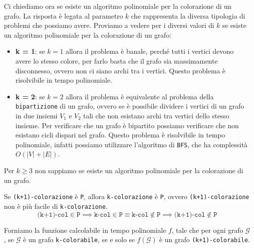 Ci chiediamo ora se esiste un algoritmo polinomiale per la colorazione di un grafo.
La risposta è legata al parametro $k$ che rappresenta la diversa tipologia di 
problemi che possiamo avere. Proviamo a vedere per i diversi valori di $k$ se esiste
un algoritmo polinomiale per la colorazione di un grafo:
\begin{itemize}
    \item \textbf{k = 1}: se $k = 1$ allora il problema è banale, perché tutti i vertici
    devono avere lo stesso colore, per farlo basta che il grafo sia massimamente disconnesso,
    ovvero non ci siano archi tra i vertici. Questo problema è risolvibile in tempo polinomiale.
    \item \textbf{k = 2}: se $k = 2$ allora il problema è equivalente al problema della
    \texttt{bipartizione} di un grafo, ovvero se è possibile dividere i vertici di un grafo
    in due insiemi $V_1$ e $V_2$ tali che non esistano archi tra vertici dello stesso insieme.
    Per verificare che un grafo è bipartito possiamo verificare che non esistano cicli dispari
    nel grafo. Questo problema è risolvibile in tempo polinomiale, infatti possiamo utilizzare
    l'algoritmo di \texttt{BFS}, che ha complessità $O(|V| + |E|)$.
\end{itemize}
Per $k \geq 3$ non sappiamo se esiste un algoritmo polinomiale per la colorazione di un grafo.

\begin{tcolorbox}[title = {$\texttt{k-colorazione} \leq_p \texttt{(k + 1)-colorazione}$}]
    Se \texttt{(k+1)-colorazione} è \texttt{P}, allora \texttt{k-colorazione} è \texttt{P},
    ovvero \texttt{(k+1)-colorazione} non è più facile di \texttt{k-colorazione}.
    \[
      \texttt{(k+1)-col} \in \texttt{P} \implies \texttt{k-col} \in \texttt{P} 
      \equiv \texttt{k-col} \not \in \texttt{P} \implies \texttt{(k+1)-col} \not \in \texttt{P}
    \]
\end{tcolorbox}
    Forniamo la funzione calcolabile in tempo polinomiale $f$, 
    tale che per ogni grafo $\mathcal{G}$, se $\mathcal{G}$ è un grafo \texttt{k-colorabile},
    se e solo se $f(\mathcal{G})$ è un grafo
    \texttt{(k+1)-colorabile}. 

